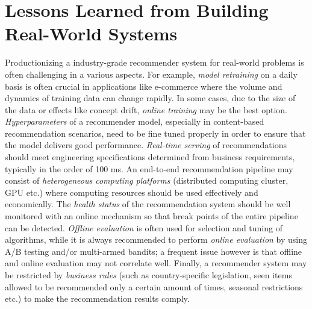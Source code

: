 \section{Lessons Learned from Building Real-World Systems} 

Productionizing a industry-grade recommender system for real-world problems is often challenging in a various aspects. For example, {\em model retraining} on a daily basis is often crucial in applications like e-commerce where the volume and dynamics of training data can change rapidly. 
In some cases, due to the size of the data or effects like concept drift, {\em online training} may be the best option. 
{\em Hyperparameters} of a recommender model, especially in content-based recommendation scenarios, need to be fine tuned properly in order to ensure that the model delivers good performance.
{\em Real-time serving} of recommendations should meet engineering specifications determined from business requirements, 
typically in the order of 100 ms. An end-to-end recommendation pipeline may consist of {\em heterogeneous computing platforms} 
(distributed computing cluster, GPU etc.) where computing resources should be used effectively and economically. 
The {\em health status} of the recommendation system should be well monitored with an online mechanism 
so that break points of the entire pipeline can be detected. 
{\em Offline evaluation} is often used for selection and tuning of algorithms, while it is always recommended to perform {\em online evaluation} 
by using A/B testing and/or multi-armed bandits; a frequent issue however is that offline and online evaluation may not correlate well. 
Finally, a recommender system may be restricted by {\em business rules} (such as country-specific legislation, 
seen items allowed to be recommended only a certain amount of times, seasonal restrictions etc.) 
to make the recommendation results comply.

